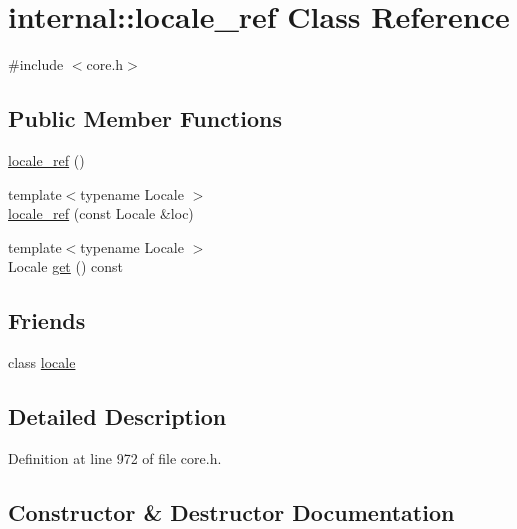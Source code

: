 \hypertarget{classinternal_1_1locale__ref}{}\section{internal\+:\+:locale\+\_\+ref Class Reference}
\label{classinternal_1_1locale__ref}


{\ttfamily \#include $<$core.\+h$>$}

\subsection*{Public Member Functions}
\begin{DoxyCompactItemize}
\item 
\hyperlink{classinternal_1_1locale__ref_acf7f433f04e1cd2160cdc9f9ab612ba1}{locale\+\_\+ref} ()
\item 
{\footnotesize template$<$typename Locale $>$ }\\\hyperlink{classinternal_1_1locale__ref_a8de4765ebdb0405dd476e1290e28d7b3}{locale\+\_\+ref} (const Locale \&loc)
\item 
{\footnotesize template$<$typename Locale $>$ }\\Locale \hyperlink{classinternal_1_1locale__ref_a25f8bf16278b8cd7c083aae1a11c49e0}{get} () const
\end{DoxyCompactItemize}
\subsection*{Friends}
\begin{DoxyCompactItemize}
\item 
class \hyperlink{classinternal_1_1locale__ref_a0a09223e17db306b813d8b07b4b344fc}{locale}
\end{DoxyCompactItemize}


\subsection{Detailed Description}


Definition at line 972 of file core.\+h.



\subsection{Constructor \& Destructor Documentation}
\mbox{\label{classinternal_1_1locale__ref_acf7f433f04e1cd2160cdc9f9ab612ba1}} 
